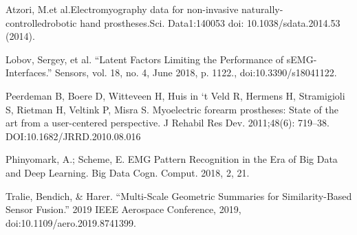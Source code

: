 \documentclass[11pt]{article}
\begin{document}
\begin{thebibliography}{5}

 Atzori, M.et al.Electromyography data for non-invasive naturally-controlledrobotic hand prostheses.Sci. Data1:140053 doi: 10.1038/sdata.2014.53 (2014).

 Lobov, Sergey, et al. “Latent Factors Limiting the Performance of sEMG-Interfaces.” Sensors, vol. 18, no. 4, June 2018, p. 1122., doi:10.3390/s18041122.

 Peerdeman  B,  Boere  D,  Witteveen  H,  Huis  in  ‘t  Veld  R,  Hermens H, Stramigioli S, Rietman H, Veltink P, Misra S. Myoelectric  forearm  prostheses:  State  of  the  art  from  a  user-centered perspective. J Rehabil Res Dev. 2011;48(6): 719–38. DOI:10.1682/JRRD.2010.08.016

 Phinyomark, A.; Scheme, E. EMG Pattern Recognition in the Era of Big Data and Deep Learning. Big Data Cogn. Comput. 2018, 2, 21. 

 Tralie, Bendich, \& Harer. “Multi-Scale Geometric Summaries for Similarity-Based Sensor Fusion.” 2019 IEEE Aerospace Conference, 2019, doi:10.1109/aero.2019.8741399.

\end{thebibliography}
  
\end{document}
